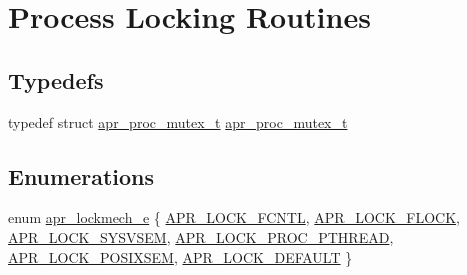 \hypertarget{group__apr__proc__mutex}{}\section{Process Locking Routines}
\label{group__apr__proc__mutex}
\subsection*{Typedefs}
\begin{DoxyCompactItemize}
\item 
typedef struct \mbox{\hyperlink{structapr__proc__mutex__t}{apr\+\_\+proc\+\_\+mutex\+\_\+t}} \mbox{\hyperlink{group__apr__proc__mutex_ga0fae3a1ab686cd1f252c6062e4c97bd2}{apr\+\_\+proc\+\_\+mutex\+\_\+t}}
\end{DoxyCompactItemize}
\subsection*{Enumerations}
\begin{DoxyCompactItemize}
\item 
enum \mbox{\hyperlink{group__apr__proc__mutex_ga75dd95a48a1e855a87b509b522746ed4}{apr\+\_\+lockmech\+\_\+e}} \{ \newline
\mbox{\hyperlink{group__apr__proc__mutex_gga75dd95a48a1e855a87b509b522746ed4ad9dad69d83d1e112054ad21a7e4e16b3}{A\+P\+R\+\_\+\+L\+O\+C\+K\+\_\+\+F\+C\+N\+TL}}, 
\mbox{\hyperlink{group__apr__proc__mutex_gga75dd95a48a1e855a87b509b522746ed4a1d06f73a37dae31233299401c9594b41}{A\+P\+R\+\_\+\+L\+O\+C\+K\+\_\+\+F\+L\+O\+CK}}, 
\mbox{\hyperlink{group__apr__proc__mutex_gga75dd95a48a1e855a87b509b522746ed4a642536695bd4c233761a15d48b1d6487}{A\+P\+R\+\_\+\+L\+O\+C\+K\+\_\+\+S\+Y\+S\+V\+S\+EM}}, 
\mbox{\hyperlink{group__apr__proc__mutex_gga75dd95a48a1e855a87b509b522746ed4abd5e7cca2c9f6023b541131f3841057a}{A\+P\+R\+\_\+\+L\+O\+C\+K\+\_\+\+P\+R\+O\+C\+\_\+\+P\+T\+H\+R\+E\+AD}}, 
\newline
\mbox{\hyperlink{group__apr__proc__mutex_gga75dd95a48a1e855a87b509b522746ed4a6d65d9d745e13d8759bd8f1057f27041}{A\+P\+R\+\_\+\+L\+O\+C\+K\+\_\+\+P\+O\+S\+I\+X\+S\+EM}}, 
\mbox{\hyperlink{group__apr__proc__mutex_gga75dd95a48a1e855a87b509b522746ed4ae91fb435c45216bcf84f506db99d0f19}{A\+P\+R\+\_\+\+L\+O\+C\+K\+\_\+\+D\+E\+F\+A\+U\+LT}}
 \}
\end{DoxyCompactItemize}
